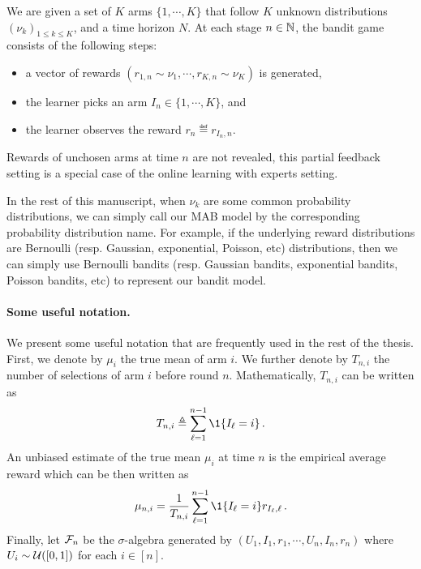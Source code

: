 \begin{definition}\label{def:mab.mab}
\begin{leftbar}[defnbar]
	We are given a set of $K$ arms $\{1,\cdots,K\}$ that follow $K$ unknown distributions $(\nu_k)_{1 \leq k \leq K}$, and a time horizon $N$. At each stage $n\in{\mathbb N}$, the bandit game consists of the following steps:
	\begin{itemize}
		\item a vector of rewards $(r_{1,n} \sim \nu_1, \cdots, r_{K,n} \sim \nu_K)$ is generated,
		\item the learner picks an arm $I_n \in \{1,\cdots,K\}$, and
		\item the learner observes the reward $r_n \eqdef r_{I_n, n}$.
	\end{itemize}
\end{leftbar}
\end{definition}

\begin{remark}\label{remark:mab.partial}
\begin{leftbar}[remarkbar]
	Rewards of unchosen arms at time $n$ are not revealed, this partial feedback setting is a special case of the online learning with experts setting.
\end{leftbar}
\end{remark}

In the rest of this manuscript, when $\nu_k$ are some common probability distributions, we can simply call our MAB model by the corresponding probability distribution name. For example, if the underlying reward distributions are Bernoulli (resp. Gaussian, exponential, Poisson, etc) distributions, then we can simply use Bernoulli bandits (resp. Gaussian bandits, exponential bandits, Poisson bandits, etc) to represent our bandit model. 

\paragraph{Some useful notation.}
We present some useful notation that are frequently used in the rest of the thesis. First, we denote by $\mu_i$ the true mean of arm $i$. We further denote by $T_{n,i}$ the number of selections of arm $i$ before round $n$. Mathematically, $T_{n,i}$ can be written as
\begin{align}\label{eq:mab.pulls}
    T_{n,i}\eqdef\sum_{\ell=1}^{n-1} \1{\{ I_{\ell} = i \}}\,.
\end{align}
An unbiased estimate of the true mean $\mu_i$ at time $n$ is the empirical average reward which can be then written as
\begin{align}\label{eq:mab.empirical_mean}
    \mu_{n,i}  = \frac{1}{T_{n,i}} \sum_{\ell=1}^{n-1} \1\{I_\ell = i\}r_{I_\ell,\ell}\,.
\end{align}
Finally, let $\mathcal{F}_n$ be the $\sigma$-algebra generated by $(U_1,I_1,r_1,\cdots,U_n,I_n,r_n)$ where $U_i\sim\mathcal{U}([0,1])$ for each $i\in[n]$.

